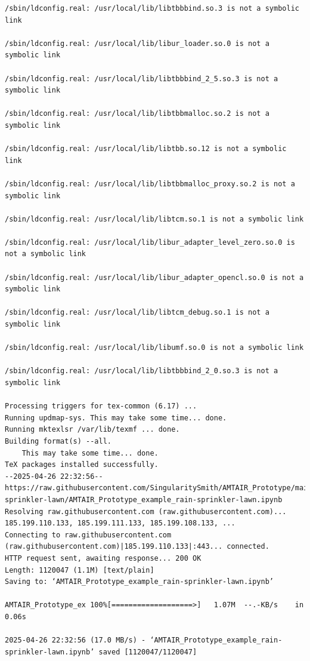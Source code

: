 \documentclass[
  11pt,
  letterpaper,
]{book}
\begin{document}
\begin{verbatim}
/sbin/ldconfig.real: /usr/local/lib/libtbbbind.so.3 is not a symbolic link

/sbin/ldconfig.real: /usr/local/lib/libur_loader.so.0 is not a symbolic link

/sbin/ldconfig.real: /usr/local/lib/libtbbbind_2_5.so.3 is not a symbolic link

/sbin/ldconfig.real: /usr/local/lib/libtbbmalloc.so.2 is not a symbolic link

/sbin/ldconfig.real: /usr/local/lib/libtbb.so.12 is not a symbolic link

/sbin/ldconfig.real: /usr/local/lib/libtbbmalloc_proxy.so.2 is not a symbolic link

/sbin/ldconfig.real: /usr/local/lib/libtcm.so.1 is not a symbolic link

/sbin/ldconfig.real: /usr/local/lib/libur_adapter_level_zero.so.0 is not a symbolic link

/sbin/ldconfig.real: /usr/local/lib/libur_adapter_opencl.so.0 is not a symbolic link

/sbin/ldconfig.real: /usr/local/lib/libtcm_debug.so.1 is not a symbolic link

/sbin/ldconfig.real: /usr/local/lib/libumf.so.0 is not a symbolic link

/sbin/ldconfig.real: /usr/local/lib/libtbbbind_2_0.so.3 is not a symbolic link

Processing triggers for tex-common (6.17) ...
Running updmap-sys. This may take some time... done.
Running mktexlsr /var/lib/texmf ... done.
Building format(s) --all.
    This may take some time... done.
TeX packages installed successfully.
--2025-04-26 22:32:56--  https://raw.githubusercontent.com/SingularitySmith/AMTAIR_Prototype/main/data/example_rain-sprinkler-lawn/AMTAIR_Prototype_example_rain-sprinkler-lawn.ipynb
Resolving raw.githubusercontent.com (raw.githubusercontent.com)... 185.199.110.133, 185.199.111.133, 185.199.108.133, ...
Connecting to raw.githubusercontent.com (raw.githubusercontent.com)|185.199.110.133|:443... connected.
HTTP request sent, awaiting response... 200 OK
Length: 1120047 (1.1M) [text/plain]
Saving to: ‘AMTAIR_Prototype_example_rain-sprinkler-lawn.ipynb’

AMTAIR_Prototype_ex 100%[===================>]   1.07M  --.-KB/s    in 0.06s   

2025-04-26 22:32:56 (17.0 MB/s) - ‘AMTAIR_Prototype_example_rain-sprinkler-lawn.ipynb’ saved [1120047/1120047]
\end{verbatim}


\backmatter
\printbibliography[title=Bibliography]
\end{document}
